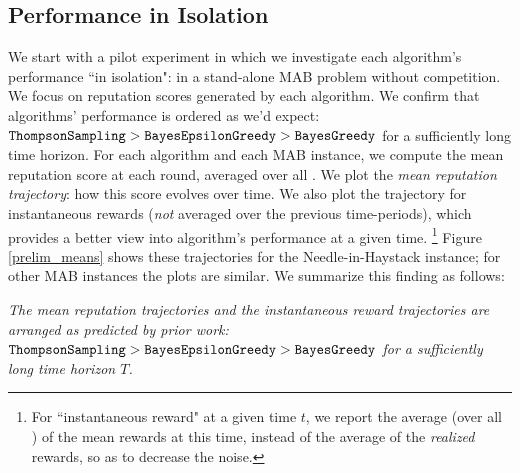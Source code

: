 \documentclass[../competing_bandits.tex]{subfiles}
\begin{document}
\subsection{Performance in Isolation}\label{sec:isolation}

We start with a pilot experiment in which we investigate each algorithm's performance ``in isolation": in a stand-alone MAB problem without competition. We focus on reputation scores generated by each algorithm. We confirm that algorithms' performance is ordered as we'd expect:
    $\mathtt{ThompsonSampling} > \mathtt{BayesEpsilonGreedy} > \mathtt{BayesGreedy}$
for a sufficiently long time horizon. For each algorithm and each MAB instance, we compute the mean reputation score at each round, averaged over all \MRVs. We plot the \emph{mean reputation trajectory}: how this score evolves over time. We also plot the trajectory for instantaneous rewards (\emph{not} averaged over the previous time-periods), which provides a better view into algorithm's performance at a given time.%
\footnote{For ``instantaneous reward" at a given time $t$, we report the average (over all \MRVs) of the mean rewards at this time, instead of the average of the \emph{realized} rewards, so as to decrease the noise.}
Figure \ref{prelim_means} shows these trajectories for the Needle-in-Haystack instance; for other MAB instances the plots are similar.
We summarize this finding as follows:

\begin{finding}
\textit{The mean reputation trajectories and the instantaneous reward trajectories are arranged as predicted by prior work:
    $\mathtt{ThompsonSampling} > \mathtt{BayesEpsilonGreedy} > \mathtt{BayesGreedy}$ for a sufficiently long time horizon $T$.}
\end{finding}
\end{document}
